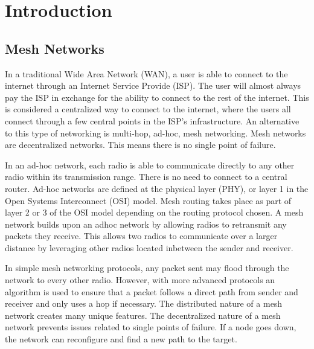 
\chapter{Introduction} %

\label{Chapter1} %


\newcommand{\keyword}[1]{\textbf{#1}}
\newcommand{\tabhead}[1]{\textbf{#1}}
\newcommand{\code}[1]{\texttt{#1}}
\newcommand{\file}[1]{\texttt{\bfseries#1}}
\newcommand{\option}[1]{\texttt{\itshape#1}}


\section{Mesh Networks}

In a traditional Wide Area Network (WAN), a user is able to connect to the internet through an Internet Service Provide (ISP). The user will almost always pay the ISP in exchange for the ability to connect to the rest of the internet. This is considered a centralized way to connect to the internet, where the users all connect through a few central points in the ISP's infrastructure. An alternative to this type of networking is multi-hop, ad-hoc, mesh networking. Mesh networks are decentralized networks. This means there is no single point of failure. 

In an ad-hoc network, each radio is able to communicate directly to any other radio within its transmission range. There is no need to connect to a central router. Ad-hoc networks are defined at the physical layer (PHY), or layer 1 in the Open Systems Interconnect (OSI) model. Mesh routing takes place as part of layer 2 or 3 of the OSI model depending on the routing protocol chosen. A mesh network builds upon an adhoc network by allowing radios to retransmit any packets they receive. This allows two radios to communicate over a larger distance by leveraging other radios located inbetween the sender and receiver. 

In simple mesh networking protocols, any packet sent may flood through the network to every other radio. However, with more advanced protocols an algorithm is used to ensure that a packet follows a direct path from sender and receiver and only uses a hop if necessary. The distributed nature of a mesh network creates many unique features. The decentralized nature of a mesh network prevents issues related to single points of failure. If a node goes down, the network can reconfigure and find a new path to the target. 

